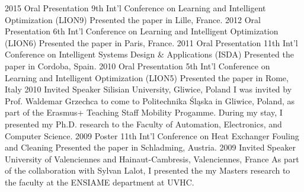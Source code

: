 \begin{entrylist}
\entry
{2015}
{Oral Presentation}
{9th Int'l Conference on Learning and Intelligent Optimization (LION9)}
{Presented the paper  in Lille, France.}
\entry
{2012}
{Oral Presentation}
{6th Int'l Conference on Learning and Intelligent Optimization (LION6)}
{Presented the paper  in Paris,  France.}
\entry
{2011}
{Oral Presentation}
{11th Int'l Conference on Intelligent Systems Design \& Applications (ISDA)}
{Presented the paper   in Cordoba, Spain.}
\entry
{2010}
{Oral Presentation}
{5th Int'l Conference on Learning and Intelligent Optimization (LION5)}
{Presented the paper  in Rome, Italy}
\entry
{2010}
{Invited Speaker}
{Silisian University, Gliwice, Poland}
{I was invited by Prof. Waldemar Grzechca to come to Politechnika Śląska in Gliwice, Poland, as part of the Erasmus+ Teaching Staff Mobility Progamme. During my stay, I presented my Ph.D. research to the Faculty of Automation, Electronics, and Computer Science.}
\entry
{2009}
{Poster}
{11th Int'l Conference on Heat Exchanger Fouling and Cleaning}
{Presented the paper  in Schladming, Austria.}
\entry
{2009}
{Invited Speaker}
{University of Valenciennes and Hainaut-Cambresis, Valenciennes, France}
{As part of the collaboration with Sylvan Lalot, I presented the my Masters research to the faculty at the ENSIAME department at UVHC.}
\end{entrylist}
